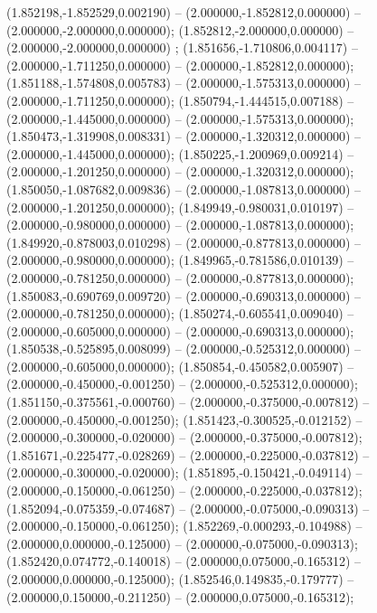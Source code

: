  (1.852198,-1.852529,0.002190) -- (2.000000,-1.852812,0.000000) -- (2.000000,-2.000000,0.000000);
 (1.852812,-2.000000,0.000000) -- (2.000000,-2.000000,0.000000) ;
 (1.851656,-1.710806,0.004117) -- (2.000000,-1.711250,0.000000) -- (2.000000,-1.852812,0.000000);
 (1.851188,-1.574808,0.005783) -- (2.000000,-1.575313,0.000000) -- (2.000000,-1.711250,0.000000);
 (1.850794,-1.444515,0.007188) -- (2.000000,-1.445000,0.000000) -- (2.000000,-1.575313,0.000000);
 (1.850473,-1.319908,0.008331) -- (2.000000,-1.320312,0.000000) -- (2.000000,-1.445000,0.000000);
 (1.850225,-1.200969,0.009214) -- (2.000000,-1.201250,0.000000) -- (2.000000,-1.320312,0.000000);
 (1.850050,-1.087682,0.009836) -- (2.000000,-1.087813,0.000000) -- (2.000000,-1.201250,0.000000);
 (1.849949,-0.980031,0.010197) -- (2.000000,-0.980000,0.000000) -- (2.000000,-1.087813,0.000000);
 (1.849920,-0.878003,0.010298) -- (2.000000,-0.877813,0.000000) -- (2.000000,-0.980000,0.000000);
 (1.849965,-0.781586,0.010139) -- (2.000000,-0.781250,0.000000) -- (2.000000,-0.877813,0.000000);
 (1.850083,-0.690769,0.009720) -- (2.000000,-0.690313,0.000000) -- (2.000000,-0.781250,0.000000);
 (1.850274,-0.605541,0.009040) -- (2.000000,-0.605000,0.000000) -- (2.000000,-0.690313,0.000000);
 (1.850538,-0.525895,0.008099) -- (2.000000,-0.525312,0.000000) -- (2.000000,-0.605000,0.000000);
 (1.850854,-0.450582,0.005907) -- (2.000000,-0.450000,-0.001250) -- (2.000000,-0.525312,0.000000);
 (1.851150,-0.375561,-0.000760) -- (2.000000,-0.375000,-0.007812) -- (2.000000,-0.450000,-0.001250);
 (1.851423,-0.300525,-0.012152) -- (2.000000,-0.300000,-0.020000) -- (2.000000,-0.375000,-0.007812);
 (1.851671,-0.225477,-0.028269) -- (2.000000,-0.225000,-0.037812) -- (2.000000,-0.300000,-0.020000);
 (1.851895,-0.150421,-0.049114) -- (2.000000,-0.150000,-0.061250) -- (2.000000,-0.225000,-0.037812);
 (1.852094,-0.075359,-0.074687) -- (2.000000,-0.075000,-0.090313) -- (2.000000,-0.150000,-0.061250);
 (1.852269,-0.000293,-0.104988) -- (2.000000,0.000000,-0.125000) -- (2.000000,-0.075000,-0.090313);
 (1.852420,0.074772,-0.140018) -- (2.000000,0.075000,-0.165312) -- (2.000000,0.000000,-0.125000);
 (1.852546,0.149835,-0.179777) -- (2.000000,0.150000,-0.211250) -- (2.000000,0.075000,-0.165312);
